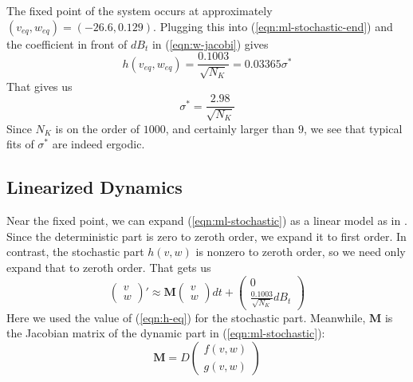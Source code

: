 \documentclass[letterpaper,12pt]{article}
\numberwithin{table}{section}
\numberwithin{figure}{section}
\numberwithin{equation}{section}
\newcommand*{\qvec}[2]{\begin{pmatrix} #1 \\ #2 \end{pmatrix}}
\begin{document}
\begin{flushleft}
    The fixed point of the system occurs at approximately $(v_{eq}, w_{eq}) = (-26.6, 0.129)$. Plugging this into (\ref{eqn:ml-stochastic-end}) and the coefficient in front of $dB_t$ in (\ref{eqn:w-jacobi}) gives
    \begin{equation}
        \label{eqn:h-eq}
        h(v_{eq}, w_{eq}) = \frac{0.1003}{\sqrt{N_K}} = 0.03365\sigma^*
    \end{equation}
    That gives us
    \begin{equation}
        \sigma^* = \frac{2.98}{\sqrt{N_K}}
    \end{equation}
    Since $N_K$ is on the order of $1000$, and certainly larger than $9$, we see that typical fits of $\sigma^*$ are indeed ergodic.

    \subsection{Linearized Dynamics}
    
    Near the fixed point, we can expand (\ref{eqn:ml-stochastic}) as a linear model as in \cite{dg}. Since the deterministic part is zero to zeroth order, we expand it to first order. In contrast, the stochastic part $h(v, w)$ is nonzero to zeroth order, so we need only expand that to zeroth order. That gets us
    \begin{equation}
        \qvec{v}{w}' \approx \mathbf{M} \qvec{v}{w} dt + \qvec{0}{\frac{0.1003}{\sqrt{N_K}} dB_t}
    \end{equation}
    Here we used the value of (\ref{eqn:h-eq}) for the stochastic part. Meanwhile, $\mathbf{M}$ is the Jacobian matrix of the dynamic part in (\ref{eqn:ml-stochastic}):
    \begin{equation}
        \mathbf{M} = D\qvec{f(v, w)}{g(v, w)}
    \end{equation}


\end{flushleft}
\end{document}
